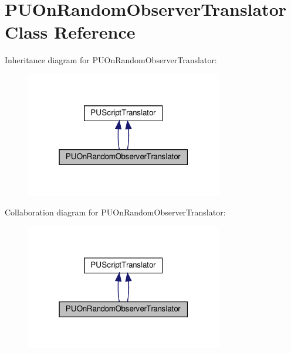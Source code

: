 \hypertarget{classPUOnRandomObserverTranslator}{}\section{P\+U\+On\+Random\+Observer\+Translator Class Reference}
\label{classPUOnRandomObserverTranslator}


Inheritance diagram for P\+U\+On\+Random\+Observer\+Translator\+:
\nopagebreak
\begin{figure}[H]
\begin{center}
\leavevmode
\includegraphics[width=244pt]{classPUOnRandomObserverTranslator__inherit__graph}
\end{center}
\end{figure}


Collaboration diagram for P\+U\+On\+Random\+Observer\+Translator\+:
\nopagebreak
\begin{figure}[H]
\begin{center}
\leavevmode
\includegraphics[width=244pt]{classPUOnRandomObserverTranslator__coll__graph}
\end{center}
\end{figure}
